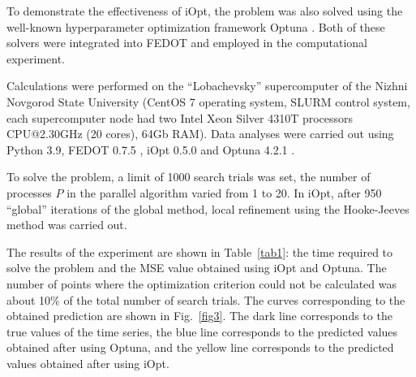 \documentclass[runningheads]{llncs}
\begin{document}
To demonstrate the effectiveness of iOpt, the problem was also solved using the well-known hyperparameter optimization framework Optuna \cite{OptunaURL,optuna}. Both of these solvers were integrated into FEDOT and employed in the computational experiment.

Calculations were performed on the ``Lobachevsky'' supercomputer of the Nizhni Novgorod State University (CentOS 7 operating system, SLURM control system, each supercomputer node had two Intel Xeon Silver 4310T processors CPU@2.30GHz (20 cores), 64Gb RAM). Data analyses were carried out using Python 3.9, FEDOT 0.7.5 \cite{FEDOT}, iOpt 0.5.0 \cite{iOptURL} and Optuna 4.2.1 \cite{OptunaURL}.

To solve the problem, a limit of 1000 search trials was set, the number of processes $P$ in the parallel algorithm varied from 1 to 20. In iOpt, after 950 ``global'' iterations of the global method, local refinement using the Hooke-Jeeves method was carried out.  %


The results of the experiment are shown in Table~\ref{tab1}: the time required to solve the problem and the MSE value obtained using iOpt and Optuna. The number of points where the optimization criterion could not be calculated was about 10\% of the total number of search trials. The curves corresponding to the obtained prediction are shown in Fig.~\ref{fig3}. The dark line corresponds to the true values of the time series, the blue line corresponds to the predicted values obtained after using Optuna, and the yellow line corresponds to the predicted values obtained after using iOpt. 
\end{document}

